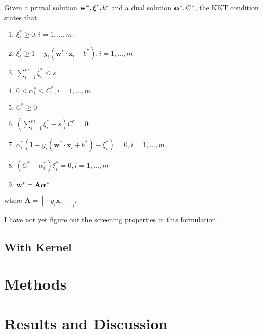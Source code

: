 \documentclass[
10pt, %
a4paper, %
oneside, %
headinclude,footinclude, %
BCOR5mm, %
]{scrartcl}
\newcommand{\AB}{\mathbf{A}}
\newcommand{\wB}{\mathbf{w}}
\newcommand{\xB}{\mathbf{x}}
\newcommand{\xiB}{\mbox{\boldmath$\xi$\unboldmath}}
\newcommand{\alphaB}{\mbox{\boldmath$\alpha$\unboldmath}}
\begin{document}
Given a primal solution $\wB^*, \xiB^*, b^*$ and a dual solution $\alphaB^*, C^*$, the KKT condition states that 
\begin{enumerate}
	\item $\xi^*_i \geq 0, i = 1, \ldots, m$.
	\item $\xi^*_i \geq 1 - y_i(\wB^*\cdot\xB_i+b^*), i = 1, \ldots, m$
	\item $\sum_{i=1}^m \xi^*_i \leq s$
	\item $0 \leq \alpha^*_i \leq C^*, i = 1, \ldots, m$
	\item $C^* \geq 0$
	\item $(\sum_{i=1}^m \xi^*_i - s) C^* = 0$
	\item $\alpha^*_i (1 - y_i(\wB^*\cdot\xB_i+b^*) - \xi^*_i) =0, i = 1, \ldots, m$
	\item $(C^* - \alpha^*_i) \xi^*_i = 0, i = 1, \ldots, m$
	\item $\wB^* = \AB \alphaB^*$
\end{enumerate}
where $\AB = [\cdots y_i\xB_i \cdots]_i$.

I have not yet figure out the screening properties in this formulation.
\subsection{With Kernel}

\section{Methods}



\section{Results and Discussion}


\renewcommand{\refname}{\spacedlowsmallcaps{References}} %




\end{document}
